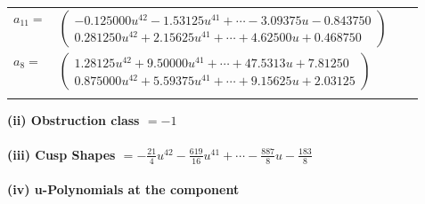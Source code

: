 \documentclass[1p]{elsarticle_modified}
\theoremstyle{definition}
\begin{document}
\begin{tabular}{m{7pt} m{180pt} m{7pt} m{180pt} }
\flushright $a_{11}=$&$\begin{pmatrix}-0.125000 u^{42}-1.53125 u^{41}+\cdots-3.09375 u-0.843750\\0.281250 u^{42}+2.15625 u^{41}+\cdots+4.62500 u+0.468750\end{pmatrix}$ \\
\flushright $a_{8}=$&$\begin{pmatrix}1.28125 u^{42}+9.50000 u^{41}+\cdots+47.5313 u+7.81250\\0.875000 u^{42}+5.59375 u^{41}+\cdots+9.15625 u+2.03125\end{pmatrix}$\\&\end{tabular}
\flushleft \textbf{(ii) Obstruction class $= -1$}\\~\\
\flushleft \textbf{(iii) Cusp Shapes $= -\frac{21}{4} u^{42}-\frac{619}{16} u^{41}+\cdots-\frac{887}{8} u-\frac{183}{8}$}\\~\\
\newpage\renewcommand{\arraystretch}{1}
\flushleft \textbf{(iv) u-Polynomials at the component}\newline \\
\end{document}
